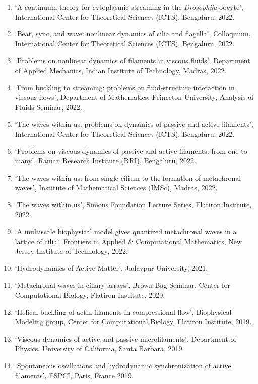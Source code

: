 \documentclass[10pt]{res} %
\begin{document}
\begin{resume}
\begin{enumerate}
	\item `A continuum theory for cytoplasmic streaming in the \textit{Drosophila} oocyte', International Center for Theoretical Sciences (ICTS), Bengaluru, 2022. 
	\item `Beat, sync, and wave: nonlinear dynamics of cilia and flagella', Colloquium, International Center for Theoretical Sciences (ICTS), Bengaluru, 2022. 
	\item `Problems on nonlinear dynamics of filaments in viscous fluids', Department of Applied Mechanics, Indian Institute of Technology, Madras, 2022.
	\item `From buckling to streaming: problems on fluid-structure interaction in viscous flows', Department of Mathematics, Princeton University, Analysis of Fluids Seminar, 2022.
	\item `The waves within us: problems on dynamics of passive and active filaments', International Center for Theoretical Sciences (ICTS), Bengaluru, 2022.
	\item `Problems on viscous dynamics of passive and active filaments: from one to many', Raman Research Institute (RRI), Bengaluru, 2022.
	\item `The waves within us: from single cilium to the formation of metachronal waves', Institute of Mathematical Sciences (IMSc), Madras, 2022.
	\item `The waves within us', Simons Foundation Lecture Series, Flatiron Institute, 2022.
	\item `A multiscale biophysical model gives quantized metachronal waves in a lattice of cilia', Frontiers in Applied \& Computational Mathematics, New Jersey Institute of Technology, 2022.
	\item `Hydrodynamics of Active Matter', Jadavpur University,  2021.
	
	\item  `Metachronal waves in ciliary arrays', Brown Bag Seminar, Center for Computational Biology, Flatiron Institute, 2020.
	
	\item  `Helical buckling of actin filaments in compressional flow', Biophysical Modeling group, Center for Computational Biology, Flatiron Institute, 2019.
	
	\item `Viscous dynamics of active and passive microfilaments',  Department of Physics, University of California, Santa Barbara, 2019.
	
	\item `Spontaneous oscillations and hydrodynamic synchronization of active filaments', ESPCI, Paris, France 2019. 
\end{enumerate}


\end{resume}
\end{document}
